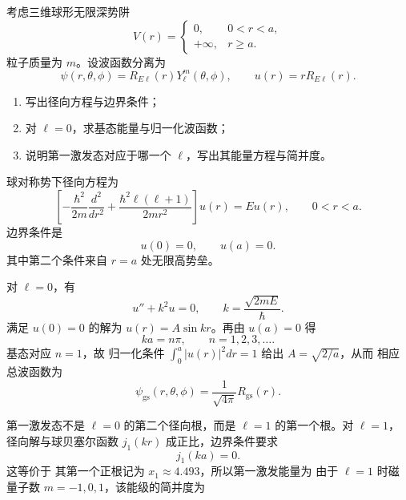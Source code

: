 \begin{question}
考虑三维球形无限深势阱
\[
V(r)=
\begin{cases}
0,& 0<r<a,\\
+\infty,& r\ge a.
\end{cases}
\]
粒子质量为 $m$。设波函数分离为
\[
\psi(r,\theta,\phi)=R_{E\ell}(r)Y_\ell^m(\theta,\phi),
\qquad u(r)=rR_{E\ell}(r).
\]

\begin{enumerate}[label=(\arabic*),leftmargin=2.5em]
  \item 写出径向方程与边界条件；
  \item 对 $\ell=0$，求基态能量与归一化波函数；
  \item 说明第一激发态对应于哪一个 $\ell$，写出其能量方程与简并度。
\end{enumerate}

\begin{solution}
球对称势下径向方程为
\[
\left[-\frac{\hbar^2}{2m}\frac{d^2}{dr^2}+\frac{\hbar^2\ell(\ell+1)}{2mr^2}\right]u(r)=Eu(r),
\qquad 0<r<a.
\]
边界条件是
\[
u(0)=0,
\qquad u(a)=0.
\]
其中第二个条件来自 $r=a$ 处无限高势垒。

对 $\ell=0$，有
\[
u''+k^2u=0,
\qquad k=\frac{\sqrt{2mE}}{\hbar}.
\]
满足 $u(0)=0$ 的解为 $u(r)=A\sin kr$。再由 $u(a)=0$ 得
\[
ka=n\pi,
\qquad n=1,2,3,\dots.
\]
基态对应 $n=1$，故
归一化条件 $\int_0^a |u(r)|^2dr=1$ 给出 $A=\sqrt{2/a}$，从而
相应总波函数为
\[
\psi_{\mathrm{gs}}(r,\theta,\phi)=\frac{1}{\sqrt{4\pi}}R_{\mathrm{gs}}(r).
\]

第一激发态不是 $\ell=0$ 的第二个径向根，而是 $\ell=1$ 的第一个根。对 $\ell=1$，径向解与球贝塞尔函数 $j_1(kr)$ 成正比，边界条件要求
\[
j_1(ka)=0.
\]
这等价于
其第一个正根记为 $x_1\approx 4.493$，所以第一激发能量为
由于 $\ell=1$ 时磁量子数 $m=-1,0,1$，该能级的简并度为
\end{solution}
\end{question}

